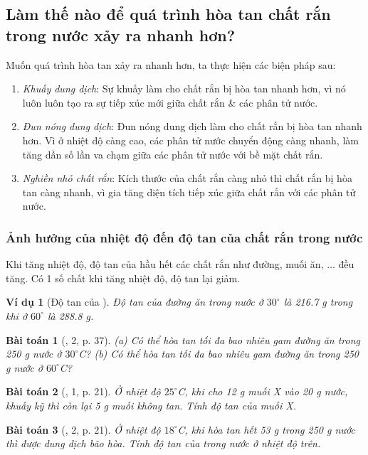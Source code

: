 \documentclass{article}
\newtheorem{baitoan}{Bài toán}
\newtheorem{vidu}{Ví dụ}
\begin{document}
\subsection{Làm thế nào để quá trình hòa tan chất rắn trong nước xảy ra nhanh hơn?}
Muốn quá trình hòa tan xảy ra nhanh hơn, ta thực hiện các biện pháp sau:
\begin{enumerate}
	\item \textit{Khuấy dung dịch}: Sự khuấy làm cho chất rắn bị hòa tan nhanh hơn, vì nó luôn luôn tạo ra sự tiếp xúc mới giữa chất rắn \& các phân tử nước.
	\item \textit{Đun nóng dung dịch}: Đun nóng dung dịch làm cho chất rắn bị hòa tan nhanh hơn. Vì ở nhiệt độ càng cao, các phân tử nước chuyển động càng nhanh, làm tăng dần số lần va chạm giữa các phân tử nước với bề mặt chất rắn.
	\item \textit{Nghiền nhỏ chất rắn}: Kích thước của chất rắn càng nhỏ thì chất rắn bị hòa tan càng nhanh, vì gia tăng diện tích tiếp xúc giữa chất rắn với các phân tử nước.
\end{enumerate}

\subsubsection{Ảnh hưởng của nhiệt độ đến độ tan của chất rắn trong nước}
Khi tăng nhiệt độ, độ tan của hầu hết các chất rắn như đường, muối ăn, $\ldots$ đều tăng. Có 1 số chất khi tăng nhiệt độ, độ tan lại giảm.

\begin{vidu}[Độ tan của ]
	Độ tan của đường ăn trong nước ở $30^\circ$ là \emph{216.7 g} trong khi ở $60^\circ$ là \emph{288.8 g}.
\end{vidu}

\begin{baitoan}[\cite{SGK_KHTN_8_Canh_Dieu}, 2, p. 37]
	(a) Có thể hòa tan tối đa bao nhiêu gam đường ăn trong \emph{250 g} nước ở $30^\circ$\emph{C}? (b) Có thể hòa tan tối đa bao nhiêu gam đường ăn trong \emph{250 g} nước ở $60^\circ$\emph{C}?
\end{baitoan}

\begin{baitoan}[\cite{SGK_KHTN_8_KNTTVCS}, 1, p. 21]
	Ở nhiệt độ $25^\circ$\emph{C}, khi cho \emph{12 g} muối X vào \emph{20 g} nước, khuấy kỹ thì còn lại \emph{5 g} muối không tan. Tính độ tan của muối X.
\end{baitoan}

\begin{baitoan}[\cite{SGK_KHTN_8_KNTTVCS}, 2, p. 21]
	Ở nhiệt độ $18^\circ$\emph{C}, khi hòa tan hết \emph{53 g} \emph{} trong \emph{250 g} nước thì được dung dịch bão hòa. Tính độ tan của \emph{} trong nước ở nhiệt độ trên.
\end{baitoan}
\end{document}
